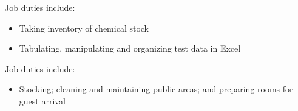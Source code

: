 \documentclass{resume}
\begin{document}
    \normalsize
    Job duties include:
    \small
    \begin{itemize}
        \item Taking inventory of chemical stock
        \item Tabulating, manipulating and organizing test data in Excel
    \end{itemize}
    \normalsize
    \medskip
    
    \normalsize
    Job duties include:
    \small
    \begin{itemize}
        \item Stocking; cleaning and maintaining public areas; and preparing rooms for guest arrival
    \end{itemize}
    \normalsize
    \medskip
\end{document}
